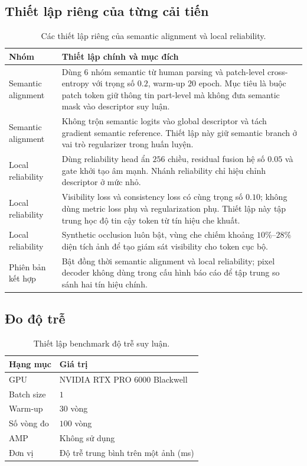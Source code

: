 \subsection{Thiết lập riêng của từng cải tiến}

\begin{table}[H]
\centering
\renewcommand{\arraystretch}{1.10}
\setlength{\tabcolsep}{3pt}
\footnotesize
\begin{tabular}{@{}L{2.4cm}L{5.4cm}@{}}
\toprule
\textbf{Nhóm} & \textbf{Thiết lập chính và mục đích} \\
\midrule
Semantic alignment & Dùng $6$ nhóm semantic từ human parsing và patch-level cross-entropy với trọng số $0.2$, warm-up $20$ epoch. Mục tiêu là buộc patch token giữ thông tin part-level mà không đưa semantic mask vào descriptor suy luận. \\
Semantic alignment & Không trộn semantic logits vào global descriptor và tách gradient semantic reference. Thiết lập này giữ semantic branch ở vai trò regularizer trong huấn luyện. \\
Local reliability & Dùng reliability head ẩn $256$ chiều, residual fusion hệ số $0.05$ và gate khởi tạo âm mạnh. Nhánh reliability chỉ hiệu chỉnh descriptor ở mức nhỏ. \\
Local reliability & Visibility loss và consistency loss có cùng trọng số $0.10$; không dùng metric loss phụ và regularization phụ. Thiết lập này tập trung học độ tin cậy token từ tín hiệu che khuất. \\
Local reliability & Synthetic occlusion luôn bật, vùng che chiếm khoảng $10\%$--$28\%$ diện tích ảnh để tạo giám sát visibility cho token cục bộ. \\
Phiên bản kết hợp & Bật đồng thời semantic alignment và local reliability; pixel decoder không dùng trong cấu hình báo cáo để tập trung so sánh hai tín hiệu chính. \\
\bottomrule
\end{tabular}
\caption{Các thiết lập riêng của semantic alignment và local reliability.}
\label{tab:appendix_method_specific}
\end{table}

\subsection{Đo độ trễ}

\begin{table}[H]
\centering
\renewcommand{\arraystretch}{1.12}
\setlength{\tabcolsep}{4pt}
\begin{tabular}{@{}L{2.7cm}L{5.0cm}@{}}
\toprule
\textbf{Hạng mục} & \textbf{Giá trị} \\
\midrule
GPU & NVIDIA RTX PRO 6000 Blackwell \\
Batch size & $1$ \\
Warm-up & $30$ vòng \\
Số vòng đo & $100$ vòng \\
AMP & Không sử dụng \\
Đơn vị & Độ trễ trung bình trên một ảnh (ms) \\
\bottomrule
\end{tabular}
\caption{Thiết lập benchmark độ trễ suy luận.}
\label{tab:appendix_latency}
\end{table}
